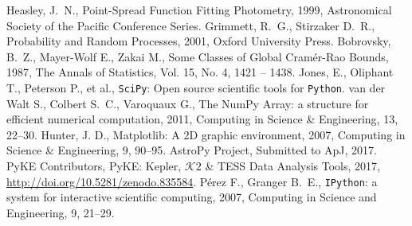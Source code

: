 \documentclass{rnaastex}
\begin{document}
\begin{thebibliography}{}
     Heasley, J.~N., Point-Spread Function
        Fitting Photometry, 1999, Astronomical Society of the Pacific Conference Series.
     Grimmett, R.~G.,
        Stirzaker D.~R., Probability and Random Processes, 2001, Oxford University Press.
     Bobrovsky, B.~Z.,
        Mayer-Wolf E., Zakai M., Some Classes of Global Cram\'er-Rao Bounds, 1987,
        The Annals of Statistics, Vol. 15, No. 4, 1421 -- 1438.
     Jones, E., Oliphant T.,
        Peterson P., et al., \texttt{SciPy}: Open source scientific tools
        for \texttt{Python}.
     van der Walt S., Colbert S.~C.,
        Varoquaux G., The NumPy Array: a structure for efficient numerical
        computation, 2011, Computing in Science \& Engineering, 13, 22--30.
     Hunter, J. D., Matplotlib: A 2D graphic
        environment, 2007, Computing in Science \& Engineering, 9, 90--95.
     AstroPy Project, Submitted to ApJ, 2017.
     PyKE Contributors, PyKE: Kepler,
        $\mathcal{K}\mathit{2}$ \& TESS Data Analysis Tools, 2017,
        \url{http://doi.org/10.5281/zenodo.835584}.
     P\'erez F., Granger B.~E.,
        \texttt{IPython}: a system for interactive scientific computing, 2007,
        Computing in Science and Engineering, 9, 21--29.
\end{thebibliography}
\end{document}
